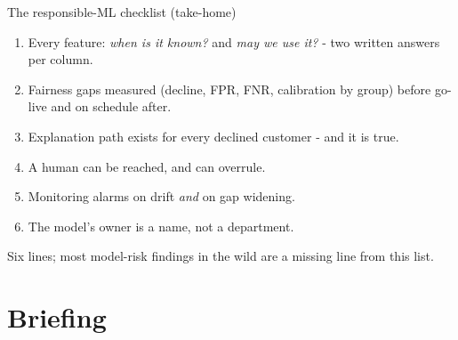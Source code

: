 \documentclass[10pt,aspectratio=169]{beamer}
\begin{document}
\begin{frame}{The responsible-ML checklist (take-home)}
  \begin{enumerate}
    \item Every feature: \emph{when is it known?} and \emph{may we use
          it?} - two written answers per column.
    \item Fairness gaps \alert{measured} (decline, FPR, FNR, calibration
          by group) before go-live and on schedule after.
    \item Explanation path exists for every declined customer - and it
          is \alert{true}.
    \item A human can be reached, and can overrule.
    \item Monitoring alarms on drift \emph{and} on gap widening.
    \item The model's owner is a name, not a department.
  \end{enumerate}
  \vspace{0.4em}
  \begin{center}\small
    Six lines; most model-risk findings in the wild are a missing line
    from this list.
  \end{center}
\end{frame}

\section{Briefing}
\end{document}
